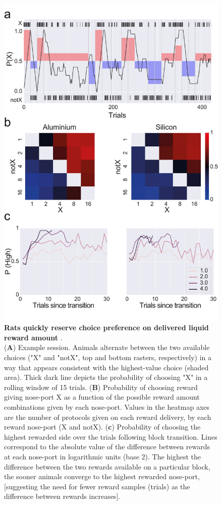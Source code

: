 \begin{figure}[ht] 
	\centering
	\includegraphics[width=1.0\linewidth]{Figures/Artboard 9.pdf}
	\caption{\textbf{Rats quickly reserve choice preference on delivered liquid reward amount }.\\
		(\textbf{A}) Example session. Animals alternate between the two available choices ("X" and "notX", top and bottom rasters, respectively) in a way that appears consistent with the highest-value choice (shaded area). Thick dark line depicts the probability of choosing "X" in a rolling window of 15 trials. (\textbf{B}) Probability of choosing reward giving nose-port X as a function of the possible reward amount combinations given by each nose-port. Values in the heatmap axes are the number of protocols given on each reward delivery, by each reward nose-port (X and notX). (\textbf{c}) Probability of choosing the highest rewarded side over the trials following block transition. Lines correspond to the absolute value of the difference between rewards at each nose-port in logarithmic units (base 2). The highest the difference between the two rewards available on a particular block, the sooner animals converge to the highest rewarded nose-port, [suggesting the need for fewer reward samples (trials) as the difference between rewards increases]. }
	\label{fig:Behavior} 
\end{figure}

